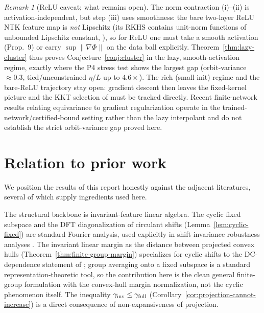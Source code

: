 \documentclass[11pt]{article}
\theoremstyle{plain}
\theoremstyle{definition}
\theoremstyle{remark}
\newtheorem{remark}{Remark}
\begin{document}
\begin{remark}[ReLU caveat; what remains open]\label{rem:lazy-relu}
The norm contraction (i)--(ii) is activation-independent, but step (iii) uses smoothness: the bare two-layer ReLU NTK feature map is \emph{not} Lipschitz (its RKHS contains unit-norm functions of unbounded Lipschitz constant, \citealp[Prop.~3]{BiettiMairalNTK2019}), so for ReLU one must take a smooth activation (Prop.~9) or carry $\sup\|\nabla\Phi\|$ on the data ball explicitly.  Theorem~\ref{thm:lazy-cluster} thus proves Conjecture~\ref{conj:cluster} in the lazy, smooth-activation regime, exactly where the P4 stress test shows the largest gap (orbit-variance $\approx0.3$, tied/unconstrained $\eta/L$ up to $4.6\times$).  The rich (small-init) regime and the bare-ReLU trajectory stay open: gradient descent then leaves the fixed-kernel picture and the KKT selection of \citet{Lyu2020,Ji2020} must be tracked directly.  Recent finite-network results relating equivariance to gradient regularization \citep{BridgingSymRobust2025} operate in the trained-network/certified-bound setting rather than the lazy interpolant and do not establish the strict orbit-variance gap proved here.
\end{remark}

\section{Relation to prior work}\label{sec:novelty-audit}
We position the results of this report honestly against the adjacent literatures, several of which supply ingredients used here.

The structural backbone is invariant-feature linear algebra.  The cyclic fixed subspace and the DFT diagonalization of circulant shifts (Lemma~\ref{lem:cyclic-fixed}) are standard Fourier analysis, used explicitly in shift-invariance robustness analyses \citep{Ge2021}.  The invariant linear margin as the distance between projected convex hulls (Theorem~\ref{thm:finite-group-margin}) specializes for cyclic shifts to the DC-dependence statement of \citet{Ge2021}; group averaging onto a fixed subspace is a standard representation-theoretic tool, so the contribution here is the clean general finite-group formulation with the convex-hull margin normalization, not the cyclic phenomenon itself.  The inequality $\gamma_{\rm inv}\le\gamma_{\rm full}$ (Corollary~\ref{cor:projection-cannot-increase}) is a direct consequence of non-expansiveness of projection.
\end{document}
